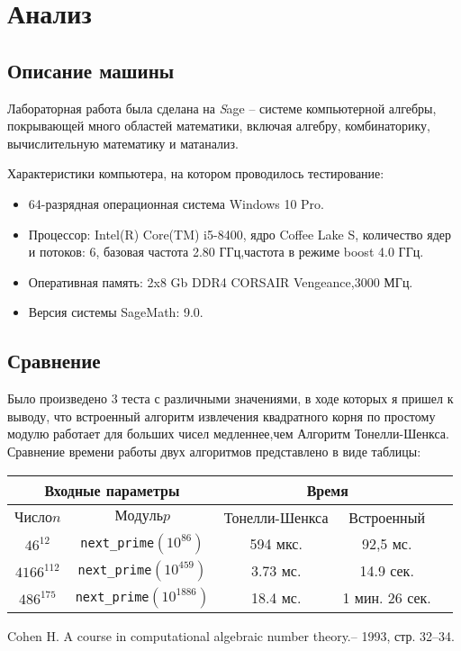 \documentclass[11pt]{article}
\begin{document}
\newpage

\section{Анализ}
\subsection{Описание машины}

Лабораторная работа была сделана на {\textit Sage} -- системе компьютерной алгебры, покрывающей много областей математики, включая алгебру, комбинаторику, вычислительную математику и матанализ.

Характеристики компьютера, на котором проводилось тестирование:
\begin{itemize}
	\item 64-разрядная операционная система Windows 10 Pro.
	\item Процессор: Intel(R) Core(TM) i5-8400, ядро Coffee Lake S, 
	количество ядер и потоков: 6, базовая частота 2.80 ГГц,частота в режиме boost 4.0 ГГц.
	\item Оперативная память: 2x8 Gb DDR4 CORSAIR Vengeance,3000 МГц.
	\item Версия системы SageMath: 9.0.
\end{itemize}

\subsection{Сравнение}
Было произведено 3 теста с различными значениями, в ходе которых я пришел к выводу, что встроенный алгоритм извлечения квадратного корня по простому модулю работает для больших чисел медленнее,чем Алгоритм Тонелли-Шенкса. Сравнение времени работы двух алгоритмов представлено в виде таблицы: 
\\

\begin{center}
\begin{tabular}{|c|c|c|c|c|}
	\hline
	
	\multicolumn{2}{|c|}{Входные параметры} & \multicolumn{2}{|c|}{Время}\\
	\hline
	$Число n$ & $Модуль p$ & Тонелли-Шенкса & Встроенный\\[5pt] 
	\hline
	$46^{12}$ & \verb|next_prime|$(10^{86})$ & 594 мкс. & 92,5 мс.\\
	\hline
	$4166^{112}$ & \verb|next_prime|$(10^{459})$ & 3.73 мс. & 14.9 сек.\\
	\hline
    $486^{175}$ & \verb|next_prime|$(10^{1886})$ & 18.4 мс. & 1 мин. 26 сек.\\
	\hline	
\end{tabular}	
\end{center}
\begin{thebibliography}{1}	
	Cohen H. A course in computational algebraic number theory.-- 1993, стр. 32--34.
\end{thebibliography}
\end{document}
